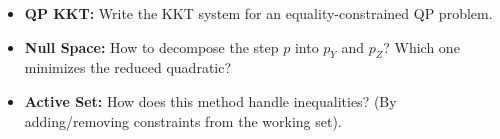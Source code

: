 \bigskip
\begin{checkpoint}
\begin{itemize}
    \item \textbf{QP KKT:} Write the KKT system for an equality-constrained QP problem.
    \item \textbf{Null Space:} How to decompose the step $p$ into $p_Y$ and $p_Z$? Which one minimizes the reduced quadratic?
    \item \textbf{Active Set:} How does this method handle inequalities? (By adding/removing constraints from the working set).
\end{itemize}
\end{checkpoint}
